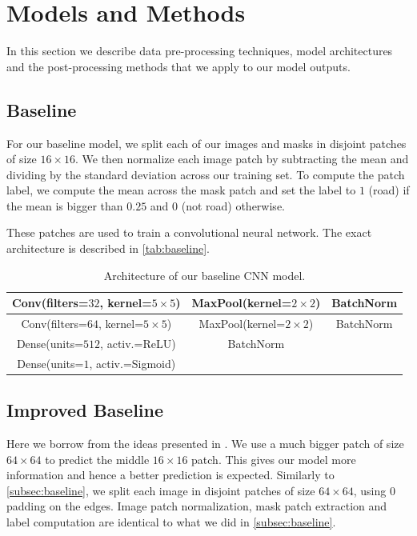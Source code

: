 \section{Models and Methods} \label{sec:models-and-methods}
In this section we describe data pre-processing techniques, model architectures and the post-processing methods that we apply to our model outputs.

\subsection{Baseline} \label{subsec:baseline}
For our baseline model, we split each of our images and masks in disjoint patches of size $16 \times 16$. We then normalize each image patch by subtracting the mean and dividing by the standard deviation across our training set. To compute the patch label, we compute the mean across the mask patch and set the label to $1$ (road) if the mean is bigger than $0.25$ and $0$ (not road) otherwise.

These patches are used to train a convolutional neural network. The exact architecture is described in \autoref{tab:baseline}.

\begin{table}[h]
    \centering
    \begin{tabular}{|c|c|c|}
        \hline
        Conv(filters=$32$, kernel=$5 \times 5$) & MaxPool(kernel=$2 \times 2$) & BatchNorm \\
        \hline
        \hline
        Conv(filters=$64$, kernel=$5 \times 5$) & MaxPool(kernel=$2 \times 2$) & BatchNorm \\
        \hline
        \hline
        Dense(units=$512$, activ.=ReLU) & BatchNorm &  \\
        \hline
        \hline
        Dense(units=$1$, activ.=Sigmoid) & & \\
        \hline
    \end{tabular}
    \caption{Architecture of our baseline CNN model.}
    \label{tab:baseline}
\end{table}

\subsection{Improved Baseline} \label{subsec:better-baseline}
Here we borrow from the ideas presented in \cite{Mni10}. We use a much bigger patch of size $64 \times 64$ to predict the middle $16 \times 16$ patch. This gives our model more information and hence a better prediction is expected. Similarly to \autoref{subsec:baseline}, we split each image in disjoint patches of size $64 \times 64$, using $0$ padding on the edges. Image patch normalization, mask patch extraction and label computation are identical to what we did in \autoref{subsec:baseline}.


